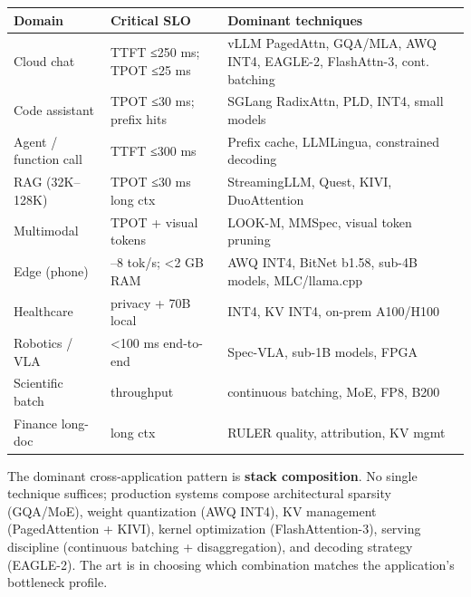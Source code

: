 {\def\LTcaptype{none} %
\begin{longtable}[]{@{}
  >{\raggedright\arraybackslash}p{}
  >{\raggedright\arraybackslash}p{}
  >{\raggedright\arraybackslash}p{}@{}}
\toprule\noalign{}
\begin{minipage}[b]{\linewidth}\raggedright
Domain
\end{minipage} & \begin{minipage}[b]{\linewidth}\raggedright
Critical SLO
\end{minipage} & \begin{minipage}[b]{\linewidth}\raggedright
Dominant techniques
\end{minipage} \\
\midrule\noalign{}
\endhead
\bottomrule\noalign{}
\endlastfoot
Cloud chat & TTFT ≤250 ms; TPOT ≤25 ms & vLLM PagedAttn, GQA/MLA, AWQ INT4, EAGLE-2, FlashAttn-3, cont. batching \\
Code assistant & TPOT ≤30 ms; prefix hits & SGLang RadixAttn, PLD, INT4, small models \\
Agent / function call & TTFT ≤300 ms & Prefix cache, LLMLingua, constrained decoding \\
RAG (32K--128K) & TPOT ≤30 ms long ctx & StreamingLLM, Quest, KIVI, DuoAttention \\
Multimodal & TPOT + visual tokens & LOOK-M, MMSpec, visual token pruning \\
Edge (phone) & 5--8 tok/s; \textless2 GB RAM & AWQ INT4, BitNet b1.58, sub-4B models, MLC/llama.cpp \\
Healthcare & privacy + 70B local & INT4, KV INT4, on-prem A100/H100 \\
Robotics / VLA & \textless100 ms end-to-end & Spec-VLA, sub-1B models, FPGA \\
Scientific batch & throughput & continuous batching, MoE, FP8, B200 \\
Finance long-doc & long ctx & RULER quality, attribution, KV mgmt \\
\end{longtable}
}

The dominant cross-application pattern is \textbf{stack composition}. No single technique suffices; production systems compose architectural sparsity (GQA/MoE), weight quantization (AWQ INT4), KV management (PagedAttention + KIVI), kernel optimization (FlashAttention-3), serving discipline (continuous batching + disaggregation), and decoding strategy (EAGLE-2). The art is in choosing which combination matches the application's bottleneck profile.

